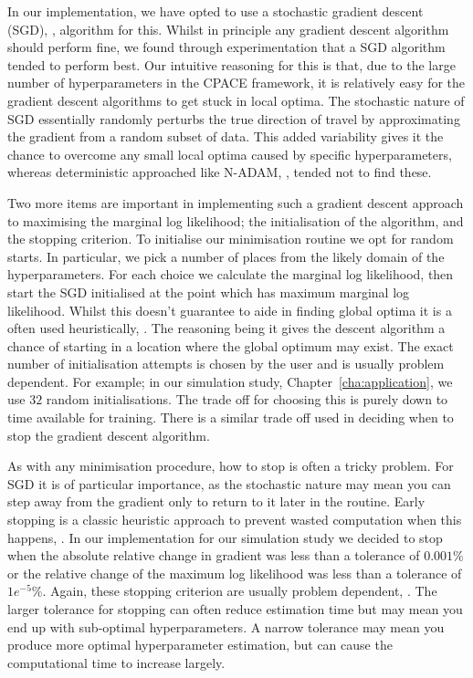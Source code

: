 In our implementation, we have opted to use a stochastic gradient descent (SGD), \citep{sra_optimization_2012}, algorithm for this.
Whilst in principle any gradient descent algorithm should perform fine, we found through experimentation that a SGD algorithm tended to perform best.
Our intuitive reasoning for this is that, due to the large number of hyperparameters in the CPACE framework, it is relatively easy for the gradient descent algorithms to get stuck in local optima.
The stochastic nature of SGD essentially randomly perturbs the true direction of travel by approximating the gradient from a random subset of data. 
This added variability gives it the chance to overcome any small local optima caused by specific hyperparameters, whereas deterministic approached like N-ADAM, \citep{dozat_incorporating_2016}, tended not to find these.

Two more items are important in implementing such a gradient descent approach to maximising the marginal log likelihood; the initialisation of the algorithm, and the stopping criterion.
To initialise our minimisation routine we opt for random starts.
In particular, we pick a number of places from the likely domain of the hyperparameters.
For each choice we calculate the marginal log likelihood, then start the SGD initialised at the point which has maximum marginal log likelihood.
Whilst this doesn't guarantee to aide in finding global optima it is a often used heuristically, \citep{sra_optimization_2012}.
The reasoning being it gives the descent algorithm a chance of starting in a location where the global optimum may exist.
The exact number of initialisation attempts is chosen by the user and is usually problem dependent. 
For example; in our simulation study, Chapter~\ref{cha:application},  we use $32$ random initialisations.
The trade off for choosing this is purely down to time available for training.
There is a similar trade off used in deciding when to stop the gradient descent algorithm.

As with any minimisation procedure, how to stop is often a tricky problem.
For SGD it is of particular importance, as the stochastic nature may mean you can step away from the gradient only to return to it later in the routine.
Early stopping is a classic heuristic approach to prevent wasted computation when this happens, \citep{sra_optimization_2012}.
In our implementation for our simulation study we decided to stop when the absolute relative change in gradient was less than a tolerance of $0.001$\% or the relative change of the maximum log likelihood was less than a tolerance of $1e^{-5}$\%. 
Again, these stopping criterion are usually problem dependent, \citep{sra_optimization_2012}.
The larger tolerance for stopping can often reduce estimation time but may mean you end up with sub-optimal hyperparameters.
A narrow tolerance may mean you produce more optimal hyperparameter estimation, but can cause the computational time to increase largely.

